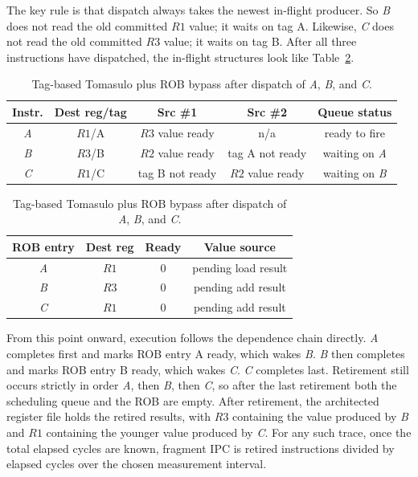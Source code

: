 The key rule is that dispatch always takes the newest in-flight producer.
So \textit{B} does not read the old committed $R1$ value; it waits on tag A\@.
Likewise, \textit{C} does not read the old committed $R3$ value; it waits on tag B\@.
After all three instructions have dispatched, the in-flight structures look like Table~\ref{tab:ilp-rob-bypass-worked}.

\begin{table}[t]
    \centering
    \small
    \renewcommand{\arraystretch}{1.15}
    \begin{tabular}{|c|c|c|c|c|}
        \hline
        Instr.
        & Dest reg/tag & Src \#1          & Src \#2          & Queue status          \\
        \hline
        \textit{A} & $R1$/A       & $R3$ value ready & n/a              & ready to fire         \\
        \hline
        \textit{B} & $R3$/B       & $R2$ value ready & tag A not ready  & waiting on \textit{A} \\
        \hline
        \textit{C} & $R1$/C       & tag B not ready  & $R2$ value ready & waiting on \textit{B} \\
        \hline
    \end{tabular}

    \vspace{1ex}

    \begin{tabular}{|c|c|c|c|}
        \hline
        ROB entry  & Dest reg & Ready & Value source        \\
        \hline
        \textit{A} & $R1$     & 0     & pending load result \\
        \hline
        \textit{B} & $R3$     & 0     & pending add result  \\
        \hline
        \textit{C} & $R1$     & 0     & pending add result  \\
        \hline
    \end{tabular}
    \caption{Tag-based Tomasulo plus ROB bypass after dispatch of \textit{A}, \textit{B}, and \textit{C}.}
    \label{tab:ilp-rob-bypass-worked}
\end{table}

From this point onward, execution follows the dependence chain directly.
\textit{A} completes first and marks ROB entry A ready, which wakes \textit{B}.
\textit{B} then completes and marks ROB entry B ready, which wakes \textit{C}.
\textit{C} completes last.
Retirement still occurs strictly in order \textit{A}, then \textit{B}, then \textit{C}, so after the last retirement both the scheduling queue and the ROB are empty.
After retirement, the architected register file holds the retired results, with $R3$ containing the value produced by \textit{B} and $R1$ containing the younger value produced by \textit{C}.
For any such trace, once the total elapsed cycles are known, fragment IPC is retired instructions divided by elapsed cycles over the chosen measurement interval.

